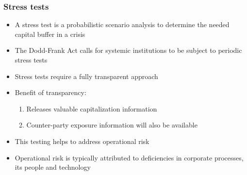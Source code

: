 \documentclass[11pt]{beamer}
\begin{document}
\begin{frame}
\frametitle{Stress tests}
\begin{itemize}\itemsep10pt
\item A stress test is a probabilistic scenario analysis to determine the needed capital buffer in a crisis
\item The Dodd-Frank Act calls for systemic institutions to be subject to periodic stress tests
\item Stress tests require a fully transparent approach
\item Benefit of transparency:
\begin{enumerate}
\item Releases valuable capitalization information
\item Counter-party exposure information will also be available
\end{enumerate}
\item This testing helps to address operational risk
\item Operational risk is typically attributed to deficiencies in corporate processes, its people and technology
\end{itemize}
\end{frame}

\begin{frame}
\begin{center}
\end{center}
\end{frame}
\end{document}
